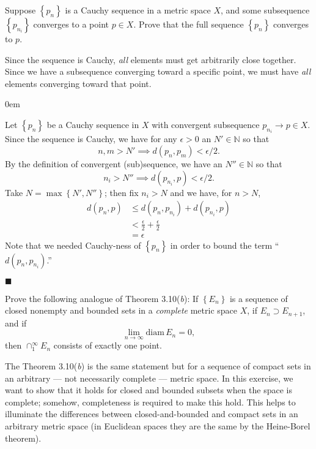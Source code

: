 \documentclass[12pt]{article}
\renewcommand{\qed}{\hfill$\blacksquare$}
\renewenvironment{proof}{\begin{addmargin}[1em]{0em}\begin{newproof}}{\end{newproof}\end{addmargin}\qed}
\newenvironment{problem}[2][Exercise]{\begin{trivlist}
\item[\hskip \labelsep {\bfseries #1}\hskip \labelsep {\bfseries #2.}]}{\end{trivlist}}
\begin{document}
\begin{problem}{3.20}
Suppose $\left\{p_n\right\}$ is a Cauchy sequence in a metric space $X$, and some subsequence $\left\{p_{n_i}\right\}$ converges to a point $p\in X$. Prove that the full sequence $\left\{p_n\right\}$ converges to $p$.
\end{problem}
{\color{red}Since the sequence is Cauchy, \textit{all} elements must get arbitrarily close together. Since we have a subsequence converging toward a specific point, we must have \textit{all} elements converging toward that point.}\\

\begin{proof}
Let $\left\{p_n\right\}$ be a Cauchy sequence in $X$ with convergent subsequence $p_{n_i}\rightarrow p \in X$. Since the sequence is Cauchy, we have for any $\epsilon>0$ an $N'\in \mathbb{N}$ so that $$ n,m > N' \implies d\left(p_n,p_m\right) < \epsilon/2.$$ By the definition of convergent (sub)sequence, we have an $N''\in \mathbb{N}$ so that $$n_i > N'' \implies d\left(p_{n_i}, p\right)<\epsilon/2.$$ Take $N = \max \left\{N',N''\right\}$; then fix $n_i > N$ and we have, for $n>N$,
\begin{align*}
	d\left(p_n, p\right) & \leq d\left(p_n, p_{n_i}\right) + d\left(p_{n_i}, p\right) \\
	& < \frac{\epsilon}{2} + \frac{\epsilon}{2} \\
	& = \epsilon
\end{align*}
Note that we needed Cauchy-ness of $\left\{p_n\right\}$ in order to bound the term ``$d\left(p_n,p_{n_i}\right)$.''
\end{proof}



\begin{problem}{3.21}
Prove the following analogue of Theorem 3.10(\textit{b}): If $\left\{E_n\right\}$ is a sequence of closed nonempty and bounded sets in a \textit{complete} metric space $X$, if $E_n \supset E_{n+1}$, and if $$\lim_{n\rightarrow \infty} \text{diam} \, E_n = 0,$$ then $\cap_1^{\infty} E_n$ consists of exactly one point.
\end{problem}
{\color{red}The Theorem 3.10(\textit{b}) is the same statement but for a sequence of compact sets in an arbitrary --- not necessarily complete --- metric space. In this exercise, we want to show that it holds for closed and bounded subsets when the space is complete; somehow, completeness is required to make this hold. This helps to illuminate the differences between closed-and-bounded and compact sets in an arbitrary metric space (in Euclidean spaces they are the same by the Heine-Borel theorem).}\\
\end{document}
